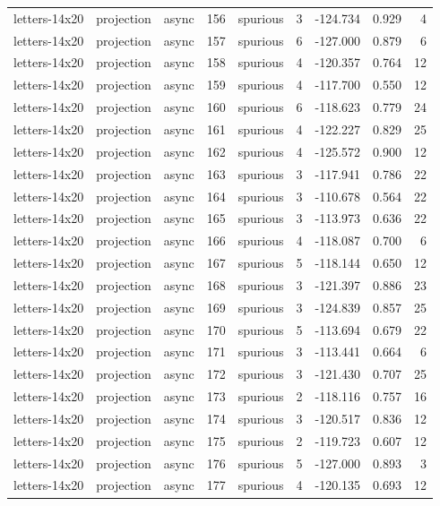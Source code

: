 \begin{tabular}{lllrlrrrr}
letters-14x20 & projection & async & 156 & spurious & 3 & -124.734 & 0.929 & 4 \\
letters-14x20 & projection & async & 157 & spurious & 6 & -127.000 & 0.879 & 6 \\
letters-14x20 & projection & async & 158 & spurious & 4 & -120.357 & 0.764 & 12 \\
letters-14x20 & projection & async & 159 & spurious & 4 & -117.700 & 0.550 & 12 \\
letters-14x20 & projection & async & 160 & spurious & 6 & -118.623 & 0.779 & 24 \\
letters-14x20 & projection & async & 161 & spurious & 4 & -122.227 & 0.829 & 25 \\
letters-14x20 & projection & async & 162 & spurious & 4 & -125.572 & 0.900 & 12 \\
letters-14x20 & projection & async & 163 & spurious & 3 & -117.941 & 0.786 & 22 \\
letters-14x20 & projection & async & 164 & spurious & 3 & -110.678 & 0.564 & 22 \\
letters-14x20 & projection & async & 165 & spurious & 3 & -113.973 & 0.636 & 22 \\
letters-14x20 & projection & async & 166 & spurious & 4 & -118.087 & 0.700 & 6 \\
letters-14x20 & projection & async & 167 & spurious & 5 & -118.144 & 0.650 & 12 \\
letters-14x20 & projection & async & 168 & spurious & 3 & -121.397 & 0.886 & 23 \\
letters-14x20 & projection & async & 169 & spurious & 3 & -124.839 & 0.857 & 25 \\
letters-14x20 & projection & async & 170 & spurious & 5 & -113.694 & 0.679 & 22 \\
letters-14x20 & projection & async & 171 & spurious & 3 & -113.441 & 0.664 & 6 \\
letters-14x20 & projection & async & 172 & spurious & 3 & -121.430 & 0.707 & 25 \\
letters-14x20 & projection & async & 173 & spurious & 2 & -118.116 & 0.757 & 16 \\
letters-14x20 & projection & async & 174 & spurious & 3 & -120.517 & 0.836 & 12 \\
letters-14x20 & projection & async & 175 & spurious & 2 & -119.723 & 0.607 & 12 \\
letters-14x20 & projection & async & 176 & spurious & 5 & -127.000 & 0.893 & 3 \\
letters-14x20 & projection & async & 177 & spurious & 4 & -120.135 & 0.693 & 12 \\

\end{tabular}
